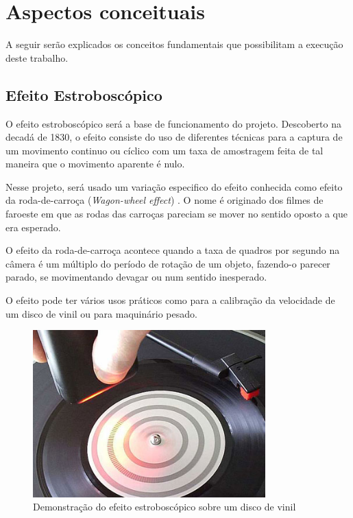 \chapter{Aspectos conceituais}
\label{CAP2}


A seguir serão explicados os conceitos fundamentais que possibilitam a execução deste trabalho. 


\section{Efeito Estroboscópico}

O efeito estroboscópico será a base de funcionamento do projeto. Descoberto na decadá de 1830, o efeito consiste do uso de diferentes técnicas para a captura de um movimento continuo ou cíclico com um taxa de amostragem feita de tal maneira que o  movimento aparente é nulo.

Nesse projeto, será usado um variação especifico do efeito conhecida como efeito da roda-de-carroça (\textit{Wagon-wheel effect}) \cite{tessive}. O nome é originado dos filmes de faroeste em que as rodas das carroças pareciam se mover no sentido oposto a que era esperado.

O efeito da roda-de-carroça  acontece quando a taxa de quadros por segundo na câmera é um múltiplo do período de rotação de um objeto, fazendo-o parecer parado, se movimentando devagar ou num sentido inesperado. 

O efeito pode ter vários usos práticos como para a calibração da velocidade de um disco de vinil ou para maquinário pesado.


\begin{figure}[H]
    \centering
    \includegraphics[width=0.8\textwidth,angle=0]{figures/strobe_3.jpg}
    \caption{Demonstração do efeito estroboscópico sobre um disco de vinil}
\end{figure}

